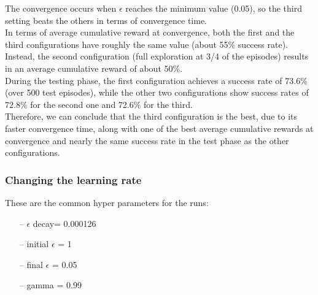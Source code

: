 \documentclass{article}
\begin{document}
\begin{center}
\centering
{}
\end{center}

\clearpage


The convergence occurs when $\epsilon$ reaches the minimum value (0.05), so the third setting beats the others in terms of convergence time.
\\
In terms of average cumulative reward at convergence, both the first and the third configurations have roughly the same value (about 55\% success rate). Instead, the second configuration (full exploration at 3/4 of the episodes) results in an average cumulative reward of about 50\%.
\\
During the testing phase, the first configuration achieves a success rate of 73.6\% (over 500 test episodes), while the other two configurations show success rates of 72.8\% for the second one and 72.6\% for the third.
\\
Therefore, we can conclude that the third configuration is the best, due to its faster convergence time, along with one of the best average cumulative rewards at convergence and nearly the same success rate in the test phase as the other configurations.


\subsubsection{Changing the learning rate}

These are the common hyper parameters for the runs:
\begin{itemize}
\item[--] $\epsilon$ decay= 0.000126
\item[--] initial $\epsilon$ = 1
\item[--] final $\epsilon$ = 0.05
\item[--] gamma = 0.99
\end{itemize}
\end{document}
